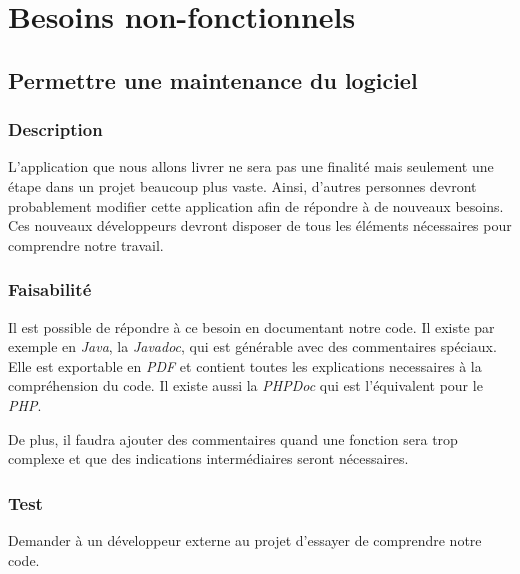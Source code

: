 \documentclass[a4paper,twoside,10pt]{report}
\begin{document}


\section{Besoins non-fonctionnels}\label{besoins_non-fonctionnels}

\subsection{Permettre une maintenance du logiciel}

\subsubsection{Description}

L’application que nous allons livrer ne sera pas une finalité mais seulement une étape dans un projet beaucoup plus vaste. Ainsi, d’autres personnes devront probablement modifier cette application afin de répondre à de nouveaux besoins. Ces nouveaux développeurs devront disposer de tous les éléments nécessaires pour comprendre notre travail.                                                                                                                                                                                                                                                                                        
\subsubsection{Faisabilité}

Il est possible de répondre à ce besoin en documentant notre code. Il existe par exemple en \textit{Java}, la \textit{Javadoc}, qui est générable avec des commentaires spéciaux. Elle est exportable en \textit{PDF} et contient toutes les explications necessaires à la compréhension du code. Il existe aussi la \textit{PHPDoc} qui est l’équivalent pour le \textit{PHP}.

De plus, il faudra ajouter des commentaires quand une fonction sera trop complexe et que des indications intermédiaires seront nécessaires.

\subsubsection{Test}

Demander à un développeur externe au projet d’essayer de comprendre notre code.
\end{document}
